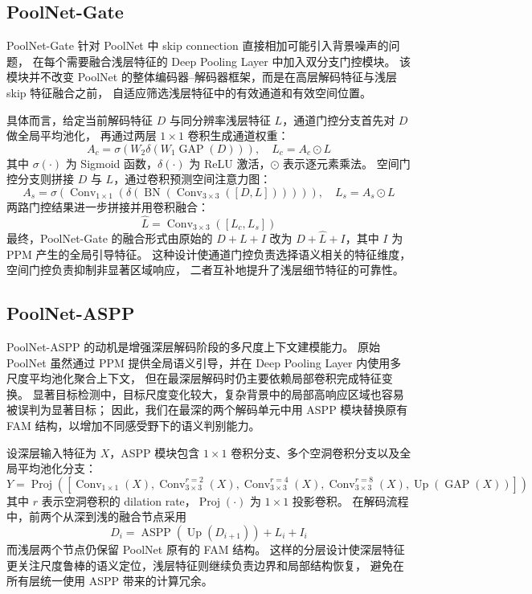 \documentclass[UTF8,a4paper,10pt]{ctexart}
\begin{document}
\subsection{PoolNet-Gate}

PoolNet-Gate 针对 PoolNet 中 skip connection 直接相加可能引入背景噪声的问题，
在每个需要融合浅层特征的 Deep Pooling Layer 中加入双分支门控模块。
该模块并不改变 PoolNet 的整体编码器--解码器框架，而是在高层解码特征与浅层 skip 特征融合之前，
自适应筛选浅层特征中的有效通道和有效空间位置。

具体而言，给定当前解码特征 \(D\) 与同分辨率浅层特征 \(L\)，通道门控分支首先对 \(D\) 做全局平均池化，
再通过两层 \(1\times1\) 卷积生成通道权重：
\[
A_c
=
\sigma
\left(
W_2
\delta
\left(
W_1
\operatorname{GAP}(D)
\right)
\right),
\quad
L_c = A_c \odot L
\]
其中 \(\sigma(\cdot)\) 为 Sigmoid 函数，\(\delta(\cdot)\) 为 ReLU 激活，\(\odot\) 表示逐元素乘法。
空间门控分支则拼接 \(D\) 与 \(L\)，通过卷积预测空间注意力图：
\[
A_s
=
\sigma
\left(
\operatorname{Conv}_{1\times1}
\left(
\delta
\left(
\operatorname{BN}
\left(
\operatorname{Conv}_{3\times3}([D,L])
\right)
\right)
\right)
\right),
\quad
L_s = A_s \odot L
\]
两路门控结果进一步拼接并用卷积融合：
\[
\hat{L}
=
\operatorname{Conv}_{3\times3}([L_c,L_s])
\]
最终，PoolNet-Gate 的融合形式由原始的
\(D+L+I\) 改为 \(D+\hat{L}+I\)，其中 \(I\) 为 PPM 产生的全局引导特征。
这种设计使通道门控负责选择语义相关的特征维度，空间门控负责抑制非显著区域响应，
二者互补地提升了浅层细节特征的可靠性。

\subsection{PoolNet-ASPP}

PoolNet-ASPP 的动机是增强深层解码阶段的多尺度上下文建模能力。
原始 PoolNet 虽然通过 PPM 提供全局语义引导，并在 Deep Pooling Layer 内使用多尺度平均池化聚合上下文，
但在最深层解码时仍主要依赖局部卷积完成特征变换。
显著目标检测中，目标尺度变化较大，复杂背景中的局部高响应区域也容易被误判为显著目标；
因此，我们在最深的两个解码单元中用 ASPP 模块替换原有 FAM 结构，以增加不同感受野下的语义判别能力。

设深层输入特征为 \(X\)，ASPP 模块包含 \(1\times1\) 卷积分支、多个空洞卷积分支以及全局平均池化分支：
\[
Y
=
\operatorname{Proj}
\left(
\left[
\operatorname{Conv}_{1\times1}(X),
\operatorname{Conv}_{3\times3}^{r=2}(X),
\operatorname{Conv}_{3\times3}^{r=4}(X),
\operatorname{Conv}_{3\times3}^{r=8}(X),
\operatorname{Up}(\operatorname{GAP}(X))
\right]
\right)
\]
其中 \(r\) 表示空洞卷积的 dilation rate，\(\operatorname{Proj}(\cdot)\) 为 \(1\times1\) 投影卷积。
在解码流程中，前两个从深到浅的融合节点采用
\[
D_i
=
\operatorname{ASPP}
\left(
\operatorname{Up}(D_{i+1})
\right)
+
L_i
+
I_i
\]
而浅层两个节点仍保留 PoolNet 原有的 FAM 结构。
这样的分层设计使深层特征更关注尺度鲁棒的语义定位，浅层特征则继续负责边界和局部结构恢复，
避免在所有层统一使用 ASPP 带来的计算冗余。
\end{document}
